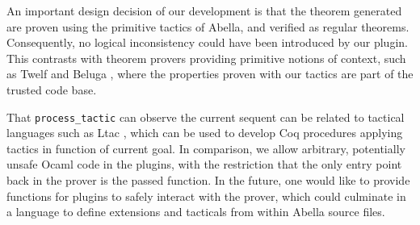 \documentclass[nocopyrightspace,authoryear]{sigplanconf}
\begin{document}
An important design decision of our development is that the theorem generated are proven using the primitive tactics of Abella, and verified as regular theorems. Consequently, no logical inconsistency could have been introduced by our plugin. This contrasts with theorem provers providing primitive notions of context, such as Twelf \cite{twelfsys} and Beluga \cite{belugasys}, where the properties proven with our tactics are part of the trusted code base.

 That \lstinline|process_tactic| can observe the current sequent can be related to tactical languages such as Ltac \cite{ltacpap}, which can be used to develop Coq procedures applying tactics in function of current goal. In comparison, we allow arbitrary, potentially unsafe Ocaml code in the plugins, with the restriction that the only entry point back in the prover is the passed function. In the future, one would like to provide functions for plugins to safely interact with the prover, which could culminate in a language to define extensions and tacticals from within Abella source files. 




 

 
\end{document}
